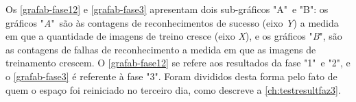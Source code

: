 Os \autoref{grafab-fase12} e \autoref{grafab-fase3} apresentam dois sub-gráficos "A"\ e "B": os gráficos "\textit{A}"\ são às contagens de reconhecimentos de sucesso (eixo \textit{Y}) a medida em que a quantidade de imagens de treino cresce (eixo \textit{X}), e os gráficos "\textit{B}", são as contagens de falhas de reconhecimento a medida em que as imagens de treinamento crescem. O \autoref{grafab-fase12} se refere aos resultados da fase "1"\ e "2", e o \autoref{grafab-fase3} é referente à fase "3". Foram divididos desta forma pelo fato de quem o espaço foi reiniciado no terceiro dia, como descreve a \autoref{ch:testresultfaz3}. 


























